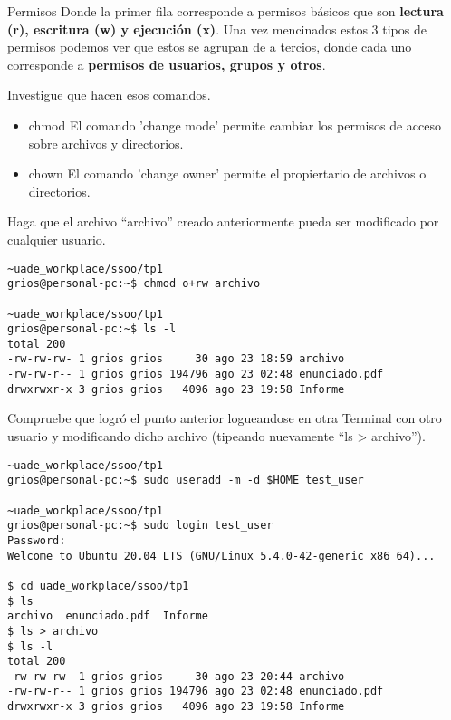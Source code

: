 \begin{section}{Permisos}
Donde la primer fila corresponde a permisos básicos que son \textbf{lectura (r), escritura (w) y ejecución (x)}.
Una vez mencinados estos 3 tipos de permisos podemos ver que estos se agrupan de a tercios, donde cada uno corresponde a \textbf{permisos de usuarios, grupos y otros}. 
\\

\begin{quoting}
Investigue que hacen esos comandos.
\end{quoting}
\begin{itemize}
\item chmod
El comando 'change mode' permite cambiar los permisos de acceso sobre archivos y directorios. 
\item chown
El comando 'change owner' permite el propiertario de archivos o directorios.  
\end{itemize}

\begin{quoting}
Haga que el archivo “archivo” creado anteriormente pueda ser modificado por cualquier usuario.
\end{quoting}

\begin{lstlisting}[style=Ubuntu]
~uade_workplace/ssoo/tp1
grios@personal-pc:~$ chmod o+rw archivo

~uade_workplace/ssoo/tp1
grios@personal-pc:~$ ls -l             
total 200
-rw-rw-rw- 1 grios grios     30 ago 23 18:59 archivo
-rw-rw-r-- 1 grios grios 194796 ago 23 02:48 enunciado.pdf
drwxrwxr-x 3 grios grios   4096 ago 23 19:58 Informe
\end{lstlisting}


\begin{quoting}
Compruebe que logró el punto anterior logueandose en otra Terminal con otro usuario y
modificando dicho archivo (tipeando nuevamente “ls > archivo”).
\end{quoting}

\begin{lstlisting}[style=Ubuntu]
~uade_workplace/ssoo/tp1
grios@personal-pc:~$ sudo useradd -m -d $HOME test_user

~uade_workplace/ssoo/tp1
grios@personal-pc:~$ sudo login test_user
Password: 
Welcome to Ubuntu 20.04 LTS (GNU/Linux 5.4.0-42-generic x86_64)...

$ cd uade_workplace/ssoo/tp1
$ ls 
archivo  enunciado.pdf	Informe
$ ls > archivo
$ ls -l 
total 200
-rw-rw-rw- 1 grios grios     30 ago 23 20:44 archivo
-rw-rw-r-- 1 grios grios 194796 ago 23 02:48 enunciado.pdf
drwxrwxr-x 3 grios grios   4096 ago 23 19:58 Informe


\end{lstlisting}
\end{section}
